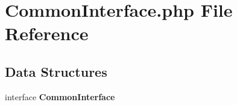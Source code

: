 \section{Common\+Interface.\+php File Reference}
\label{_common_interface_8php}
\subsection*{Data Structures}
\begin{DoxyCompactItemize}
\item 
interface {\bf Common\+Interface}
\end{DoxyCompactItemize}
